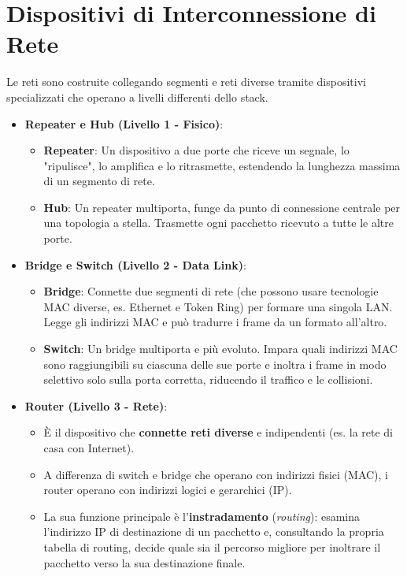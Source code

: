 \section{Dispositivi di Interconnessione di Rete}
Le reti sono costruite collegando segmenti e reti diverse tramite dispositivi specializzati che operano a livelli differenti dello stack.
\begin{itemize}
    \item \textbf{Repeater e Hub (Livello 1 - Fisico)}:
    \begin{itemize}
        \item \textbf{Repeater}: Un dispositivo a due porte che riceve un segnale, lo "ripulisce", lo amplifica e lo ritrasmette, estendendo la lunghezza massima di un segmento di rete.
        \item \textbf{Hub}: Un repeater multiporta, funge da punto di connessione centrale per una topologia a stella. Trasmette ogni pacchetto ricevuto a tutte le altre porte.
    \end{itemize}
    \item \textbf{Bridge e Switch (Livello 2 - Data Link)}:
    \begin{itemize}
        \item \textbf{Bridge}: Connette due segmenti di rete (che possono usare tecnologie MAC diverse, es. Ethernet e Token Ring) per formare una singola LAN. Legge gli indirizzi MAC e può tradurre i frame da un formato all'altro.
        \item \textbf{Switch}: Un bridge multiporta e più evoluto. Impara quali indirizzi MAC sono raggiungibili su ciascuna delle sue porte e inoltra i frame in modo selettivo solo sulla porta corretta, riducendo il traffico e le collisioni.
    \end{itemize}
    \item \textbf{Router (Livello 3 - Rete)}:
    \begin{itemize}
        \item È il dispositivo che \textbf{connette reti diverse} e indipendenti (es. la rete di casa con Internet).
        \item A differenza di switch e bridge che operano con indirizzi fisici (MAC), i router operano con indirizzi logici e gerarchici (IP).
        \item La sua funzione principale è l'\textbf{instradamento} (\textit{routing}): esamina l'indirizzo IP di destinazione di un pacchetto e, consultando la propria tabella di routing, decide quale sia il percorso migliore per inoltrare il pacchetto verso la sua destinazione finale.
    \end{itemize}
\end{itemize}

